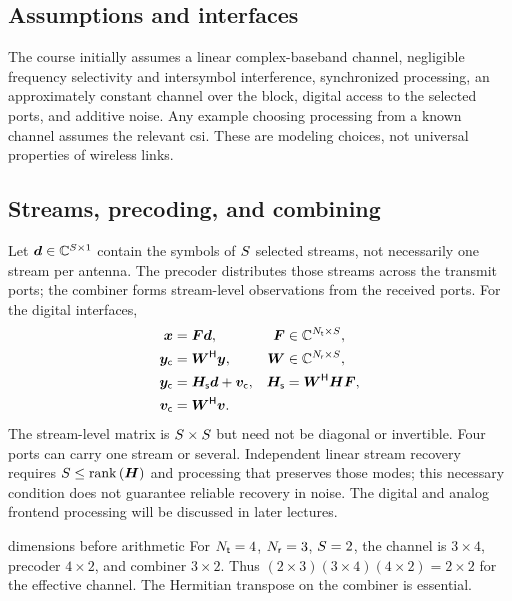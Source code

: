 \subsection{Assumptions and interfaces}
The course initially assumes a linear complex-baseband channel, negligible frequency selectivity and intersymbol interference, synchronized processing, an approximately constant channel over the block, digital access to the selected ports, and additive noise. Any example choosing processing from a known channel assumes the relevant \ac{csi}. These are modeling choices, not universal properties of wireless links.

\subsection{Streams, precoding, and combining}
Let $\bm{d}\in\mathbb{C}^{S \times 1}$ contain the symbols of $S$ selected streams, not necessarily one stream per antenna. The precoder distributes those streams across the transmit ports; the combiner forms stream-level observations from the received ports. For the  digital interfaces,
\begin{align}
\bm{x}&=\bm{F}\bm{d},&\bm{F}&\in\mathbb{C}^{N_{\mathsf{t}}\times S},\\
\bm{y}_{\mathsf c}&={\bm{W}}^{\mathsf{H}}\bm{y},&\bm{W}&\in\mathbb{C}^{N_{\mathsf{r}}\times S},\\
\bm{y}_{\mathsf c}&=\bm{H}_{\mathsf{s}}\bm{d}+\bm{v}_{\mathsf c},&\bm{H}_{\mathsf{s}}&={\bm{W}}^{\mathsf{H}}\bm{H}\bm{F},\label{eq:stream}\\
\bm{v}_{\mathsf c}&={\bm{W}}^{\mathsf{H}}\bm{v}.&&\nonumber
\end{align}
The stream-level matrix is $S\times S$ but need not be diagonal or invertible. Four ports can carry one stream or several. Independent linear stream recovery requires $S\leq\operatorname{rank}\left(\bm{H}\right)$ and processing that preserves those modes; this necessary condition does not guarantee reliable recovery in noise. The digital and analog frontend processing will be discussed in later lectures.

\begin{example}{dimensions before arithmetic}
For $N_{\mathsf{t}}=4$, $N_{\mathsf{r}}=3$, $S=2$, the channel is $3\times4$, precoder $4\times2$, and combiner $3\times2$. Thus $(2\times3)(3\times4)(4\times2)=2\times2$ for the effective channel. The Hermitian transpose on the combiner is essential.
\end{example}

